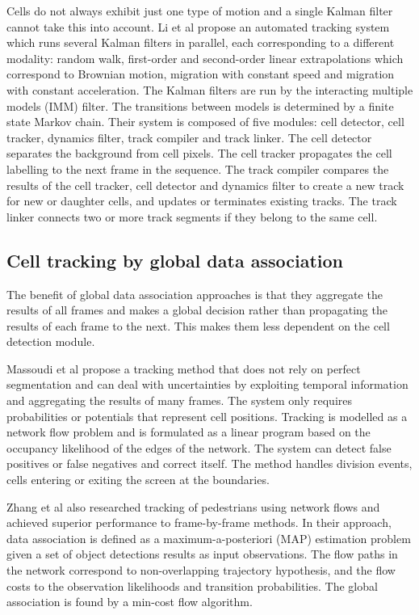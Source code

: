 Cells do not always exhibit just one type of motion and a single Kalman filter cannot take this into account. Li et al \cite{li07} propose an automated tracking system which runs several Kalman filters in parallel, each corresponding to a different modality: random walk, first-order and second-order linear extrapolations which correspond to Brownian motion, migration with constant speed and migration with constant acceleration. The Kalman filters are run by the interacting multiple models (IMM) filter. The transitions between models is determined by a finite state Markov chain. Their system is composed of five modules: cell detector, cell tracker, dynamics filter, track compiler and track linker. The cell detector separates the background from cell pixels. The cell tracker propagates the cell labelling to the next frame in the sequence. The track compiler compares the results of the cell tracker, cell detector and dynamics filter to create a new track for new or daughter cells, and updates or terminates existing tracks. The track linker connects two or more track segments if they belong to the same cell.

\subsection{Cell tracking by global data association \statusfirstdraft}

The benefit of global data association approaches is that they aggregate the results of all frames and makes a global decision rather than propagating the results of each frame to the next. This makes them less dependent on the cell detection module.

Massoudi et al \cite{massoudi12} propose a tracking method that does not rely on perfect segmentation and can deal with uncertainties by exploiting temporal information and aggregating the results of many frames. The system only requires probabilities or potentials that represent cell positions. Tracking is modelled as a network flow problem and is formulated as a linear program based on the occupancy likelihood of the edges of the network. The system can detect false positives or false negatives and correct itself. The method handles division events, cells entering or exiting the screen at the boundaries.

Zhang et al \cite{zhang08} also researched tracking of pedestrians using network flows and achieved superior performance to frame-by-frame methods. In their approach, data association is defined as a maximum-a-posteriori (MAP) estimation problem given a set of object detections results as input observations. The flow paths in the network correspond to non-overlapping trajectory hypothesis, and the flow costs to the observation likelihoods and transition probabilities. The global association is found by a min-cost flow algorithm.

